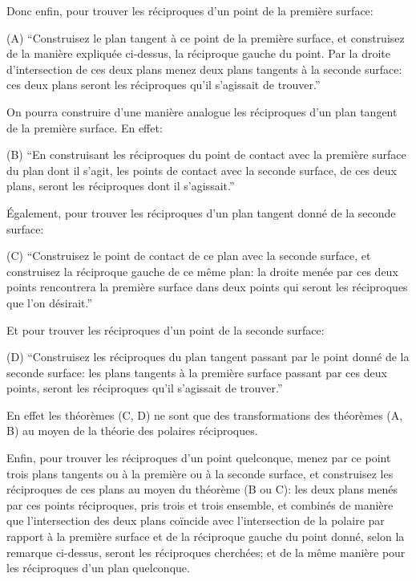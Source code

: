 \documentclass[10pt]{article}
\newcommand{\qedpage}{\vfill\pagebreak}
\begin{document}
Donc enfin, pour trouver les r\'eciproques d'un point de la premi\`ere surface:

(A) ``Construisez le plan tangent \`a ce point de la premi\`ere surface, et construisez
de la mani\`ere expliqu\'ee ci-dessus, la r\'eciproque gauche du point. Par la droite
d'intersection de ces deux plans menez deux plans tangents \`a la seconde surface:
ces deux plans seront les r\'eciproques qu'il s'agissait de trouver.''

On pourra construire d'une mani\`ere analogue les r\'eciproques d'un plan tangent de
la premi\`ere surface. En effet:

(B) ``En construisant les r\'eciproques du point de contact avec la premi\`ere surface
du plan dont il s'agit, les points de contact avec la seconde surface, de ces deux
plans, seront les r\'eciproques dont il s'agissait.''

\'Egalement, pour trouver les r\'eciproques d'un plan tangent donn\'e de la seconde
surface:

(C) ``Construisez le point de contact de ce plan avec la seconde surface, et
construisez la r\'eciproque gauche de ce m\^eme plan: la droite men\'ee par ces deux
points rencontrera la premi\`ere surface dans deux points qui seront les r\'eciproques
que l'on d\'esirait.''

Et pour trouver les r\'eciproques d'un point de la seconde surface:

(D) ``Construisez les r\'eciproques du plan tangent passant par le point donn\'e de la
seconde surface: les plans tangents \`a la premi\`ere surface passant par ces deux
points, seront les r\'eciproques qu'il s'agissait de trouver.''

En effet les th\'eor\`emes (C, D) ne sont que des transformations des th\'eor\`emes
(A, B) au moyen de la th\'eorie des polaires r\'eciproques.

Enfin, pour trouver les r\'eciproques d'un point quelconque, menez par ce point
trois plans tangents ou \`a la premi\`ere ou \`a la seconde surface, et construisez les
r\'eciproques de ces plans au moyen du th\'eor\`eme (B ou C): les deux plans men\'es
par ces points r\'eciproques, pris trois et trois ensemble, et combin\'es de mani\`ere
que l'intersection des deux plans co\"incide avec l'intersection de la polaire par
rapport \`a la premi\`ere surface et de la r\'eciproque gauche du point donn\'e, selon la
remarque ci-dessus, seront les r\'eciproques cherch\'ees; et de la m\^eme mani\`ere pour
les r\'eciproques d'un plan quelconque.
\qedpage
\end{document}
